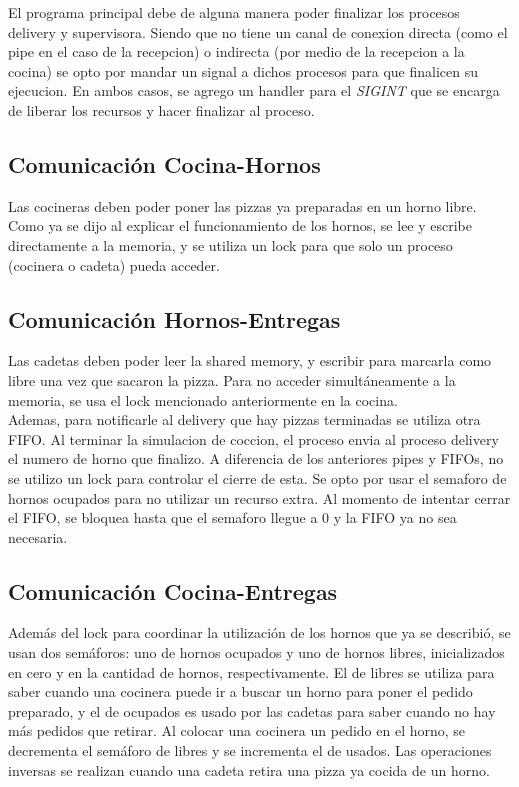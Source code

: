 \documentclass[11pt,spanish,a4paper,openany,notitlepage]{article}
\begin{document}
El programa principal debe de alguna manera poder finalizar los procesos delivery y supervisora. Siendo
que no tiene un canal de conexion directa (como el pipe en el caso de la recepcion) o indirecta (por medio de la recepcion a la cocina)
se opto por mandar un signal a dichos procesos para que finalicen su ejecucion. En ambos casos, se agrego
un handler para el \textit{SIGINT} que se encarga de liberar los recursos y hacer finalizar al proceso.

\subsection{Comunicación Cocina-Hornos}

Las cocineras deben poder poner las pizzas ya preparadas en un horno libre. Como ya se dijo al 
explicar el funcionamiento de los hornos, se lee y escribe directamente a la memoria, y se utiliza 
un lock para que solo un proceso (cocinera o cadeta) pueda acceder.

\subsection{Comunicación Hornos-Entregas}

Las cadetas deben poder leer la shared memory, y escribir para marcarla como libre una vez que 
sacaron la pizza. Para no acceder simultáneamente a la memoria, se usa el lock mencionado 
anteriormente en la cocina.\\
Ademas, para notificarle al delivery que hay pizzas terminadas se utiliza otra FIFO. Al terminar
la simulacion de coccion, el proceso envia al proceso delivery el numero de horno que finalizo.
A diferencia de los anteriores pipes y FIFOs, no se utilizo un lock para controlar el cierre de esta.
Se opto por usar el semaforo de hornos ocupados para no utilizar un recurso extra. Al momento de
intentar cerrar el FIFO, se bloquea hasta que el semaforo llegue a 0 y la FIFO ya no sea necesaria.

\subsection{Comunicación Cocina-Entregas}

Además del lock para coordinar la utilización de los hornos que ya se describió, se usan dos 
semáforos: uno de hornos ocupados y uno de hornos libres, inicializados en cero y en la cantidad de 
hornos, respectivamente. El de libres se utiliza para saber cuando una cocinera puede ir a buscar 
un horno para poner el pedido preparado, y el de ocupados es usado por las cadetas para saber 
cuando no hay más pedidos que retirar. Al colocar una cocinera un pedido en el horno, se decrementa 
el semáforo de libres y se incrementa el de usados. Las operaciones inversas se realizan cuando una 
cadeta retira una pizza ya cocida de un horno.
\end{document}
